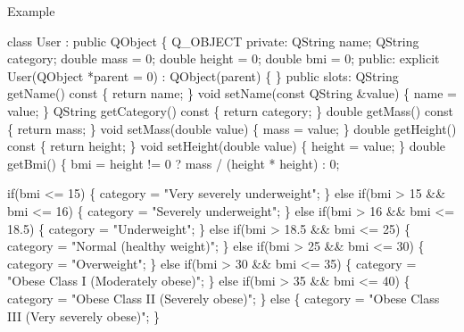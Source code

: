 \begin{DoxyParagraph}{Example}
\begin{DoxyCode}
class User : public QObject
\{
    Q\_OBJECT
\textcolor{keyword}{private}:
    QString name;
    QString category;
    \textcolor{keywordtype}{double} mass = 0;
    \textcolor{keywordtype}{double} height = 0;
    \textcolor{keywordtype}{double} bmi = 0;
\textcolor{keyword}{public}:
    \textcolor{keyword}{explicit} User(QObject *parent = 0) : QObject(parent)
    \{
    \}
\textcolor{keyword}{public} slots:
    QString getName()\textcolor{keyword}{ const}
\textcolor{keyword}{    }\{
        \textcolor{keywordflow}{return} name;
    \}
    \textcolor{keywordtype}{void} setName(\textcolor{keyword}{const} QString &value)
    \{
        name = value;
    \}
    QString getCategory()\textcolor{keyword}{ const}
\textcolor{keyword}{    }\{
        \textcolor{keywordflow}{return} category;
    \}
    \textcolor{keywordtype}{double} getMass()\textcolor{keyword}{ const}
\textcolor{keyword}{    }\{
        \textcolor{keywordflow}{return} mass;
    \}
    \textcolor{keywordtype}{void} setMass(\textcolor{keywordtype}{double} value)
    \{
        mass = value;
    \}
    \textcolor{keywordtype}{double} getHeight()\textcolor{keyword}{ const}
\textcolor{keyword}{    }\{
        \textcolor{keywordflow}{return} height;
    \}
    \textcolor{keywordtype}{void} setHeight(\textcolor{keywordtype}{double} value)
    \{
        height = value;
    \}
    \textcolor{keywordtype}{double} getBmi()
    \{
        bmi = height != 0 ? mass / (height * height) : 0;

        \textcolor{keywordflow}{if}(bmi <= 15)
        \{
            category = \textcolor{stringliteral}{"Very severely underweight"};
        \}
        \textcolor{keywordflow}{else} \textcolor{keywordflow}{if}(bmi > 15 && bmi <= 16)
        \{
            category = \textcolor{stringliteral}{"Severely underweight"};
        \}
        \textcolor{keywordflow}{else} \textcolor{keywordflow}{if}(bmi > 16 && bmi <= 18.5)
        \{
            category = \textcolor{stringliteral}{"Underweight"};
        \}
        \textcolor{keywordflow}{else} \textcolor{keywordflow}{if}(bmi > 18.5 && bmi <= 25)
        \{
            category = \textcolor{stringliteral}{"Normal (healthy weight)"};
        \}
        \textcolor{keywordflow}{else} \textcolor{keywordflow}{if}(bmi > 25 && bmi <= 30)
        \{
            category = \textcolor{stringliteral}{"Overweight"};
        \}
        \textcolor{keywordflow}{else} \textcolor{keywordflow}{if}(bmi > 30 && bmi <= 35)
        \{
            category = \textcolor{stringliteral}{"Obese Class I (Moderately obese)"};
        \}
        \textcolor{keywordflow}{else} \textcolor{keywordflow}{if}(bmi > 35 && bmi <= 40)
        \{
            category = \textcolor{stringliteral}{"Obese Class II (Severely obese)"};
        \}
        \textcolor{keywordflow}{else}
        \{
            category = \textcolor{stringliteral}{"Obese Class III (Very severely obese)"};
        \}


\end{DoxyCode}
\end{DoxyParagraph}
